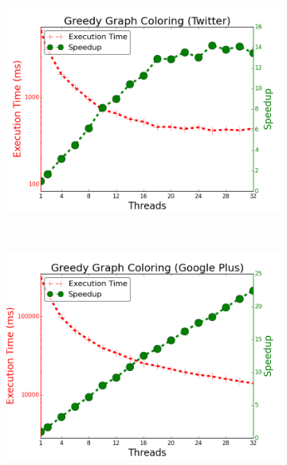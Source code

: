 \begin{figure}[]
        \begin{subfigure}[b]{\plotsize\textwidth}
                \includegraphics[width=\textwidth]{experiments/scalability/scale-greedy-graph-coloring-twitter.png}
                \label{fig:implementation:scale_ggc_twitter}
        \end{subfigure}
        ~
        \begin{subfigure}[b]{\plotsize\textwidth}
                \includegraphics[width=\textwidth]{experiments/scalability/scale-greedy-graph-coloring-gplus.png}
                \label{fig:implementation:scale_ggc_gplus}
        \end{subfigure}\\


        \label{fig:implementation:scale_ggc}
\end{figure}

